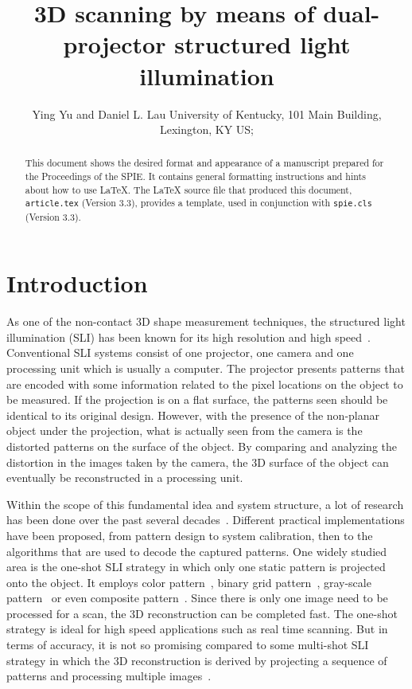 \documentclass[]{spie}  %
\title{3D scanning by means of dual-projector structured light illumination}
\author{Ying Yu\supit{a} and Daniel L. Lau\supit{a}
\skiplinehalf
\supit{a}University of Kentucky, 101 Main Building, Lexington, KY US; \\
}
\begin{document}
 
  \maketitle 

\begin{abstract}
This document shows the desired format and appearance of a manuscript prepared for the Proceedings of the SPIE.  It contains general formatting instructions and hints about how to use LaTeX.  The LaTeX source file that produced this document, {\tt article.tex} (Version 3.3), provides a template, used in conjunction with {\tt spie.cls} (Version 3.3).  
\end{abstract}



\section{Introduction}
\label{sec:intro}  %
As one of the non-contact 3D shape measurement techniques, the structured light illumination (SLI) has been known for its high resolution and high speed~\cite{chen00}. Conventional SLI systems consist of one projector, one camera and one processing unit which is usually a computer. The projector presents patterns that are encoded with some information related to the pixel locations on the object to be measured. If the projection is on a flat surface, the patterns seen should be identical to its original design. However, with the presence of the non-planar object under the projection, what is actually seen from the camera is the distorted patterns on the surface of the object. By comparing and analyzing the distortion in the images taken by the camera, the 3D surface of the object can eventually be reconstructed in a processing unit.

Within the scope of this fundamental idea and system structure, a lot of research has been done over the past several decades~\cite{geng11}. Different practical implementations have been proposed, from pattern design to system calibration, then to the algorithms that are used to decode the captured patterns. One widely studied area is the one-shot SLI strategy in which only one static pattern is projected onto the object. It employs color pattern~\cite{wust91}, binary grid pattern~\cite{grin92}, gray-scale pattern~\cite{durd98} or even composite pattern~\cite{guan08}. Since there is only one image need to be processed for a scan, the 3D reconstruction can be completed fast. The one-shot strategy is ideal for high speed applications such as real time scanning. But in terms of accuracy, it is not so promising compared to some multi-shot SLI strategy in which the 3D reconstruction is derived by projecting a sequence of patterns and processing multiple images~\cite{blai03}.
\end{document}
